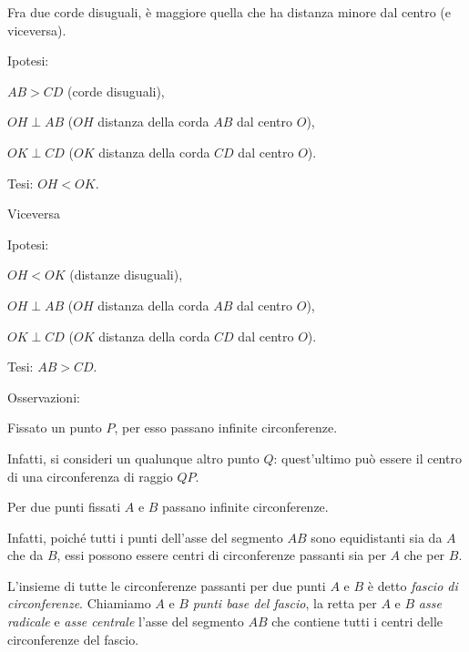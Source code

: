 \begin{teorema}
Fra due corde disuguali, è maggiore quella che ha distanza minore dal 
centro (e viceversa).
\end{teorema}

\noindent Ipotesi:
\begin{itemize*}
\item $AB>CD$ (corde disuguali),
\item $OH\perp AB$ ($OH$ distanza della corda $AB$ dal centro $O$),
\item $OK\perp CD$ ($OK$ distanza della corda $CD$ dal centro $O$).
\end{itemize*}
\noindent Tesi: $OH < OK$.\vspace{10pt}

\begin{minipage}{0.35\textwidth}
  \centering
\end{minipage}\vspace{10pt}

\noindent Viceversa\vspace{10pt}

\noindent Ipotesi:
\begin{itemize*}
\item $OH<OK$ (distanze disuguali),
\item $OH\perp AB$ ($OH$ distanza della corda $AB$ dal centro $O$),
\item $OK\perp CD$ ($OK$ distanza della corda $CD$ dal centro $O$).
\end{itemize*}
\noindent Tesi: $AB>CD$.


Osservazioni:
\begin{itemize*}
\item Fissato un punto $P$, per esso passano infinite circonferenze.

Infatti, si consideri un qualunque altro punto $Q$: quest'ultimo può 
essere il centro di una circonferenza di raggio $QP$.

\item Per due punti fissati $A$ e $B$ passano infinite circonferenze.

Infatti, poiché tutti i punti dell'asse del segmento $AB$ sono 
equidistanti sia da $A$ che da $B$, essi possono essere centri di 
circonferenze passanti sia per $A$ che per $B$.
\end{itemize*}

\begin{definizione}
L'insieme di tutte le circonferenze passanti per due punti $A$ e $B$ 
è detto \emph{fascio di circonferenze}. Chiamiamo $A$ e $B$ 
\emph{punti base del fascio}, la retta per $A$ e $B$ \emph{asse 
radicale} e \emph{asse centrale} l'asse del segmento $AB$ che contiene 
tutti i centri delle circonferenze del fascio.
\end{definizione}

